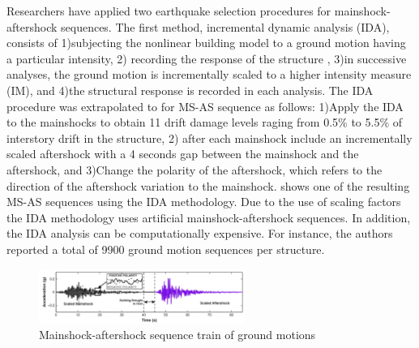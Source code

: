 Researchers have applied two earthquake selection procedures for mainshock-aftershock sequences. The first method, incremental dynamic analysis (IDA), consists of 1)subjecting the nonlinear building model to a ground motion having a particular intensity, 2) recording the response of the structure \cite{Vamvatsikos2002}, 3)in successive analyses, the ground motion is incrementally scaled to a higher intensity measure (IM), and 4)the structural response is recorded in each analysis. The IDA procedure was extrapolated to for MS-AS sequence as follows: 1)Apply the IDA to the mainshocks to obtain 11 drift damage levels raging from 0.5\% to 5.5\% of interstory drift in the structure, 2) after each mainshock include an incrementally scaled aftershock with a 4 seconds gap between the mainshock and the aftershock, and 3)Change the polarity of the aftershock, which refers to the direction of the aftershock variation to the mainshock.  shows one of the resulting MS-AS sequences using the IDA methodology. Due to the use of scaling factors the IDA methodology uses artificial mainshock-aftershock sequences. In addition, the IDA analysis can be computationally expensive. For instance, the authors reported a total of 9900 ground motion sequences per structure.

\begin{figure}[htbp]
\centering
\includegraphics[width=0.6\textwidth]{Chapter-2/figs/MS-AS_sequence_Luco}
\caption{Mainshock-aftershock sequence train of ground motions \cite{Raghunandan2015}}
\label{fig:MS-AS_Luco}
\end{figure}


